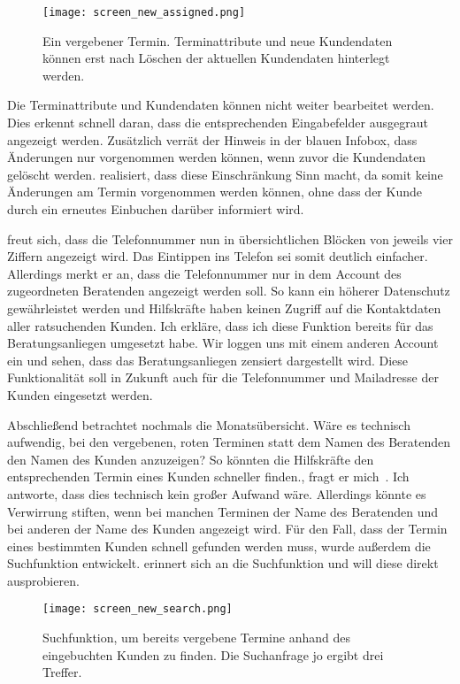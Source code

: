 \begin{figure}[H]
    \caption{Ein vergebener Termin. Terminattribute und neue Kundendaten können erst nach Löschen der aktuellen Kundendaten hinterlegt werden.}
    \centering
    \texttt{[image: screen\_new\_assigned.png]}
\end{figure}

Die Terminattribute und Kundendaten können nicht weiter bearbeitet werden. Dies
erkennt \ipName schnell daran, dass die entsprechenden Eingabefelder ausgegraut
angezeigt werden. Zusätzlich verrät der Hinweis in der blauen Infobox, dass
Änderungen nur vorgenommen werden können, wenn zuvor die Kundendaten gelöscht
werden. \ipName realisiert, dass diese Einschränkung Sinn macht, da somit keine
Änderungen am Termin vorgenommen werden können, ohne dass der Kunde durch ein
erneutes Einbuchen darüber informiert wird.

\ipName freut sich, dass die Telefonnummer nun in übersichtlichen Blöcken von jeweils vier Ziffern angezeigt wird. Das Eintippen ins Telefon sei somit deutlich einfacher. Allerdings merkt er an, dass die Telefonnummer nur in dem Account des zugeordneten Beratenden angezeigt werden soll. So kann ein höherer Datenschutz gewährleistet werden und Hilfskräfte haben keinen Zugriff auf die Kontaktdaten aller ratsuchenden Kunden. Ich erkläre, dass ich diese Funktion bereits für das Beratungsanliegen umgesetzt habe. Wir loggen uns mit einem anderen Account ein und sehen, dass das Beratungsanliegen zensiert dargestellt wird. Diese Funktionalität soll in Zukunft auch für die Telefonnummer und Mailadresse der Kunden eingesetzt werden.

Abschließend betrachtet \ipName nochmals die Monatsübersicht. \glqq{}Wäre es
technisch aufwendig, bei den vergebenen, roten Terminen statt dem Namen des
Beratenden den Namen des Kunden anzuzeigen? So könnten die Hilfskräfte den
entsprechenden Termin eines Kunden schneller finden.\grqq{}, fragt er
mich~\cite{clavesUsertest}. Ich antworte, dass dies technisch kein großer
Aufwand wäre. Allerdings könnte es Verwirrung stiften, wenn bei manchen
Terminen der Name des Beratenden und bei anderen der Name des Kunden angezeigt
wird. Für den Fall, dass der Termin eines bestimmten Kunden schnell gefunden
werden muss, wurde außerdem die Suchfunktion entwickelt. \ipName erinnert sich
an die Suchfunktion und will diese direkt ausprobieren.

\begin{figure}[H]
    \caption{Suchfunktion, um bereits vergebene Termine anhand des eingebuchten Kunden zu finden. Die Suchanfrage \glqq{}jo\grqq{} ergibt drei Treffer.}
    \centering
    \texttt{[image: screen\_new\_search.png]}
\end{figure}

